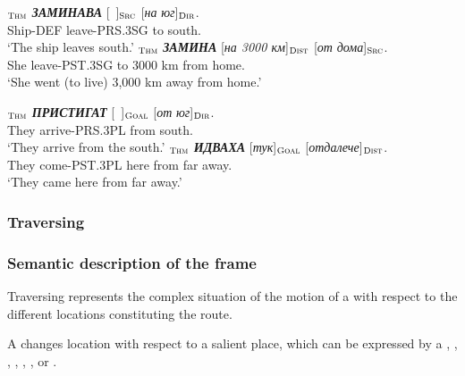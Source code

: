 \documentclass[output=paper,colorlinks,citecolor=brown]{langscibook}
\begin{document}
\begin{exe}
\ex \label{ex:20}
\begin{xlist}
\ex \label{ex:20:а}
$_{\text{\textsc{Thm}}}$ \textit{\textbf{ЗАМИНАВА}} [\ ]$_{\text{\textsc{Src}}}$ [\textit{на} \textit{юг}]$_{\text{\textsc{Dir}}}$. \\
Ship-DEF leave-PRS.3SG  {} to south. \\
\glt `The ship leaves south.'
\ex \label{ex:20:b}
\gll [\textit{Тя}]$_{\text{\textsc{Thm}}}$ \textit{\textbf{ЗАМИНА}} [\textit{на 3000 км}]$_{\text{\textsc{Dist}}}$ [\textit{от} \textit{дома}]$_{\text{\textsc{Src}}}$. \\
 She leave-PST.3SG to 3000 km from home. \\
\glt `She went (to live) 3,000 km away from home.'
\end{xlist}
\end{exe}

\begin{exe}
\ex  \label{ex:21}
\begin{xlist}
\ex  \label{ex:21:а}
\gll [\textit{Те}]$_{\text{\textsc{Thm}}}$ \textit{\textbf{ПРИСТИГАТ}} [\ ]$_{\text{\textsc{Goal}}}$ [\textit{от} \textit{юг}]$_{\text{\textsc{Dir}}}$. \\
They arrive-PRS.3PL {} from south. \\
\glt `They arrive from the south.'
\ex \label{ex:21:b}
\gll [\textit{\ }]$_{\text{\textsc{Thm}}}$ \textit{\textbf{ИДВАХА}} [\textit{тук}]$_{\text{\textsc{Goal}}}$ [\textit{отдалече}]$_{\text{\textsc{Dist}}}$. \\
They come-PST.3PL here {from  far away}. \\
\glt `They came here from far away.'
\end{xlist}
\end{exe}


\subsubsection{Traversing}
\subsubsection{Semantic description of the  frame}

Traversing represents the complex situation of the motion of a  with respect to the different locations constituting the route.

\begin{description}[font=\normalfont]
\item[Definition of the frame \framename{Traversing}:] A  changes location with respect to a salient place, which can be expressed by a , , , , , , or .
\end{description}
\end{document}
